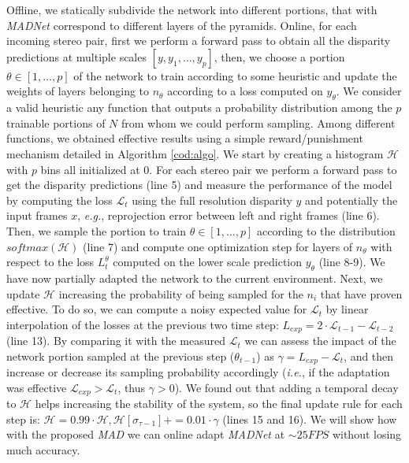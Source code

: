 \documentclass[10pt,twocolumn,letterpaper]{article}
\def\eg{\emph{e.g.}}
\def\ie{\emph{i.e.}}
\newcommand{\stefanoscomments}[2]{ \color{magenta} #1 \color{black}}
\def\netname{\emph{MADNet}}
\def\algoname{\emph{MAD}}
\begin{document}
Offline, we statically subdivide the network into different portions, that with \netname{} correspond to different layers of the pyramids. Online, for each incoming stereo pair, first we perform a forward pass to obtain all the disparity predictions at multiple scales $[y,y_1,\dots,y_p]$, then, we choose a portion $\theta \in [1,\dots,p]$ of the network to train according to some heuristic and update the weights of layers belonging to $n_\theta$ according to a loss computed on $y_\theta$. We consider a valid heuristic any function that outputs a probability distribution among the $p$ trainable portions of $N$ from whom we could perform sampling. 
Among different functions, we obtained effective results using a simple reward/punishment mechanism detailed in Algorithm \autoref{cod:algo}. 
We start by creating a histogram $\mathcal{H}$ with $p$ bins all initialized at 0. For each stereo pair we perform a forward pass to get the disparity predictions (line 5) and measure the performance of the model by computing the loss $\mathcal{L}_t$ using the full resolution disparity $y$ and potentially the input frames $x$, \eg, reprojection error between left and right frames \cite{godard2017unsupervised} (line 6). Then, we sample the portion to train $\theta \in [1,\dots,p]$ according to the distribution $softmax(\mathcal{H})$ (line 7) and compute one optimization step for layers of $n_\theta$ with respect to the loss $L^{\theta}_t$ computed on the lower scale prediction $y_\theta$ (line 8-9). We have now partially adapted the network to the current environment. Next, we update $\mathcal{H}$ increasing the probability of being sampled for the $n_i$ that have proven effective. To do so, we can compute a noisy expected value for $\mathcal{L}_t$ by linear interpolation of the losses at the previous two time step: $L_{exp} = 2 \cdot \mathcal{L}_{t-1}-\mathcal{L}_{t-2}$ (line 13). By comparing it with the measured $\mathcal{L}_t$ we can assess the impact of the network portion sampled at the previous step ($\theta_{t-1}$) as $\gamma = L_{exp}-\mathcal{L}_t$, and then increase or decrease its sampling probability accordingly (\ie, if the adaptation was effective $\mathcal{L}_{exp}>\mathcal{L}_{t}$, thus $\gamma>0$). We found out that adding a temporal decay to $\mathcal{H}$ helps increasing the stability of the system, so the final update rule for each step is: $\mathcal{H}=0.99\cdot\mathcal{H}, \mathcal{H}[\sigma_{\tau-1}]+=0.01\cdot\gamma$ (lines 15 and 16). 
We will show how with the proposed \algoname{} we can online adapt \netname{} at $\sim25FPS$ without losing much accuracy.
\end{document}
